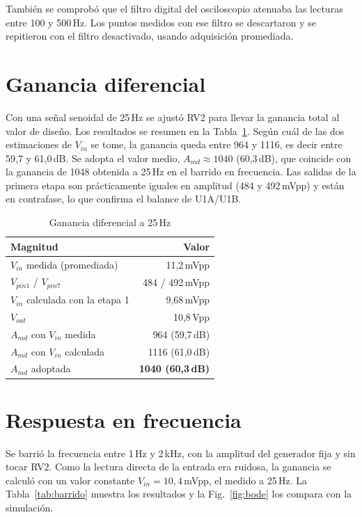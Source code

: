 \documentclass[journal,a4paper]{IEEEtran}
\begin{document}
También se comprobó que el filtro digital del osciloscopio atenuaba las lecturas entre 100 y 500\,Hz. Los puntos medidos con ese filtro se descartaron y se repitieron con el filtro desactivado, usando adquisición promediada.

\section{Ganancia diferencial}

Con una señal senoidal de 25\,Hz se ajustó RV2 para llevar la ganancia total al valor de diseño. Los resultados se resumen en la Tabla~\ref{tab:amd}. Según cuál de las dos estimaciones de $V_{in}$ se tome, la ganancia queda entre 964 y 1116, es decir entre 59,7 y 61,0\,dB. Se adopta el valor medio, $A_{md}\approx 1040$ (60,3\,dB), que coincide con la ganancia de 1048 obtenida a 25\,Hz en el barrido en frecuencia. Las salidas de la primera etapa son prácticamente iguales en amplitud (484 y 492\,mVpp) y están en contrafase, lo que confirma el balance de U1A/U1B.

\begin{table}[!t]
\centering
\caption{Ganancia diferencial a 25\,Hz}
\label{tab:amd}
\begin{tabular}{@{}lr@{}}
\toprule
Magnitud & Valor \\ \midrule
$V_{in}$ medida (promediada) & 11,2\,mVpp \\
$V_{pin1}$ / $V_{pin7}$ & 484 / 492\,mVpp \\
$V_{in}$ calculada con la etapa 1 & 9,68\,mVpp \\
$V_{out}$ & 10,8\,Vpp \\ \midrule
$A_{md}$ con $V_{in}$ medida & 964 (59,7\,dB) \\
$A_{md}$ con $V_{in}$ calculada & 1116 (61,0\,dB) \\
$A_{md}$ adoptada & \textbf{1040 (60,3\,dB)} \\ \bottomrule
\end{tabular}
\end{table}

\section{Respuesta en frecuencia}

Se barrió la frecuencia entre 1\,Hz y 2\,kHz, con la amplitud del generador fija y sin tocar RV2. Como la lectura directa de la entrada era ruidosa, la ganancia se calculó con un valor constante $V_{in} = 10{,}4$\,mVpp, el medido a 25\,Hz. La Tabla~\ref{tab:barrido} muestra los resultados y la Fig.~\ref{fig:bode} los compara con la simulación.
\end{document}
